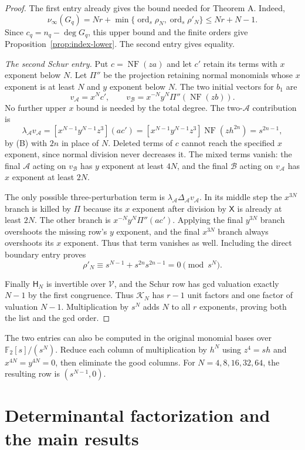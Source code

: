 \documentclass[11pt,a4paper,reqno]{amsart}
\numberwithin{equation}{section}
\theoremstyle{plain}
\theoremstyle{definition}
\theoremstyle{remark}
\DeclareMathOperator{\NF}{NF}
\DeclareMathOperator{\ord}{ord}
\begin{document}
\begin{proof}
The first entry already gives the bound needed for Theorem A. Indeed,
\[
 \nu_\infty(G_q)=Nr+\min\{\ord_s\rho_N,\ord_s\rho'_N\}
                 \leq Nr+N-1 .
\]
Since $c_q=n_q-\deg G_q$, this upper bound and the finite orders
give Proposition~\ref{prop:index-lower}. The second entry gives equality.

\emph{The second Schur entry.}
Put $c=\NF(za)$ and let $c'$ retain its terms with $x$ exponent below $N$. Let $\Pi''$ be the projection retaining normal monomials whose $x$ exponent is at least $N$ and $y$ exponent below $N$. The two initial vectors for $b_1$ are
\[
v_{\mathcal A}=x^Nc',\qquad
v_{\mathcal B}=x^{-N}y^N\Pi''(\NF(zb)).
\]
No further upper $x$ bound is needed by the total degree. The two-$\mathcal A$ contribution is
\[
\lambda_{\mathcal A}v_{\mathcal A}
=[x^{N-1}y^{N-1}z^3](ac')
=[x^{N-1}y^{N-1}z^3]\NF(zh^{2n})
=s^{2n-1},
\]
by (B) with $2n$ in place of $N$. Deleted terms of $c$ cannot reach the specified $x$ exponent, since normal division never decreases it. The mixed terms vanish: the final $\mathcal A$ acting on $v_{\mathcal B}$ has $y$ exponent at least $4N$, and the final $\mathcal B$ acting on $v_{\mathcal A}$ has $x$ exponent at least $2N$.

The only possible three-perturbation term is $\lambda_{\mathcal A}\Delta_{\mathcal A}v_{\mathcal A}$. In its middle step the $x^{3N}$ branch is killed by $\Pi$ because its $x$ exponent after division by $\mathsf X$ is already at least $2N$. The other branch is $x^{-N}y^N\Pi''(ac')$. Applying the final $y^{3N}$ branch overshoots the missing row's $y$ exponent, and the final $x^{3N}$ branch always overshoots its $x$ exponent. Thus that term vanishes as well. Including the direct boundary entry proves
\[
\rho'_N\equiv s^{N-1}+s^{2n}s^{2n-1}=0\pmod{s^N}.
\]

Finally $\mathsf H_N$ is invertible over $\mathcal V$, and the Schur row has gcd valuation exactly $N-1$ by the first congruence. Thus $\mathcal K_N$ has $r-1$ unit factors and one factor of valuation $N-1$. Multiplication by $s^N$ adds $N$ to all $r$ exponents, proving both the list and the gcd order.
\end{proof}

The two entries can also be computed in the original monomial bases
over $\mathbb F_2[s]/(s^N)$. Reduce each column of multiplication by
$h^N$ using $z^4=sh$ and $x^{4N}=y^{4N}=0$, then eliminate the good
columns. For $N=4,8,16,32,64$, the resulting row is $(s^{N-1},0)$.

\section{Determinantal factorization and the main results}\label{sec:main}
\end{document}

